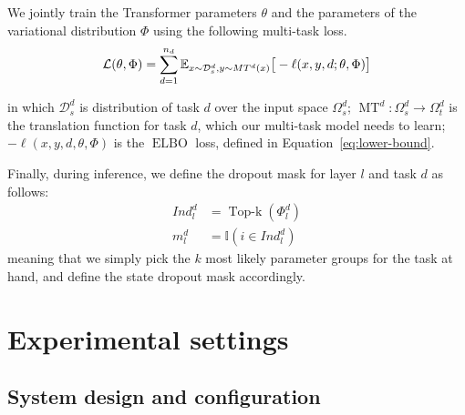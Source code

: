 \documentclass[11pt]{article}
\newcommand{\fyDone}[1]{\done[FY]\Todo[FY:]{\textcolor{orange}{#1}}}
\begin{document}
We jointly train the Transformer parameters $\theta$ and the parameters of the variational distribution $\Phi$ using the following multi-task loss.\fyDone{This is repeated}
\begin{align*}
\hspace{-0.em}
\mathcal{L}(\theta,\Phi) = \sum_{d=1}^{n_d} \mathbb{E}_{x \sim \mathcal{D}_s^d,y \sim MT^d(x)} \big[-\ell(x,y,d; \theta,\Phi)\big]
\end{align*}

in which $\mathcal{D}_s^d$ is distribution of task $d$ over the input space $\Omega^d_s$; $\operatorname{MT}^d: \Omega^d_s \rightarrow \Omega^d_t$\fyDone{already defined} is the translation function for task $d$, which our multi-task model needs to learn; $-\ell(x,y, d, \theta,\Phi)$ is the $\operatorname{ELBO}$ loss, defined in Equation~\ref{eq:lower-bound}.

Finally, during inference, we define the dropout mask for layer $l$ and task $d$ as follows:
\begin{align*}
  Ind_l^d &= \operatorname{Top-k}(\Phi_l^d) \\
  m_l^d &= \mathbb{I}(i\in Ind_l^d)
\end{align*}
meaning that we simply pick the $k$ most likely parameter groups for the task at hand, and define the state dropout mask accordingly.

\section{Experimental settings \label{sec:experiments}}

\subsection{System design and configuration}
\end{document}
